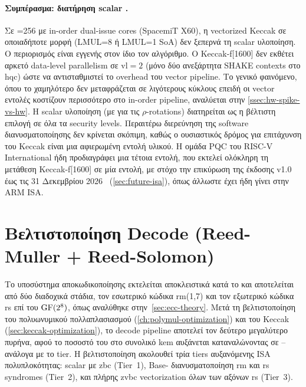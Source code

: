 \paragraph{Συμπέρασμα: διατήρηση scalar \Zbb.}
Σε \VLEN{}=\num{256} με in-order dual-issue cores (SpacemiT X60), η vectorized
Keccak σε οποιαδήποτε μορφή (LMUL=8 ή LMUL=1 SoA) δεν ξεπερνά τη scalar
υλοποίηση. Ο περιορισμός είναι εγγενής στον ίδιο τον αλγόριθμο. Ο Keccak-f[1600]
δεν εκθέτει αρκετό data-level parallelism σε $\text{vl}=2$ (μόνο δύο ανεξάρτητα
SHAKE contexts στο \gls{hqc}) ώστε να αντισταθμιστεί το overhead του vector
pipeline. Το γενικό φαινόμενο, όπου το χαμηλότερο \instret δεν μεταφράζεται σε
λιγότερους κύκλους επειδή οι vector εντολές κοστίζουν περισσότερο στο in-order
pipeline, αναλύεται στην \cref{ssec:hw-spike-vs-hw}. Η scalar \Zbb υλοποίηση
(με  για τις $\rho$-rotations) διατηρείται ως η βέλτιστη επιλογή σε
όλα τα security levels. Περαιτέρω διερεύνηση της software διανυσματοποίησης δεν
κρίνεται σκόπιμη, καθώς ο ουσιαστικός δρόμος για επιτάχυνση του Keccak είναι μια
αφιερωμένη εντολή υλικού. Η ομάδα PQC του RISC-V International ήδη προδιαγράφει
μια τέτοια εντολή, που εκτελεί ολόκληρη τη μετάθεση Keccak-f[1600] σε μία εντολή,
με στόχο την επικύρωση της έκδοσης v1.0 έως τις \num{31} Δεκεμβρίου
2026~\cite{RISCV-PQC-Keccak-Plan2026} (\cref{sec:future-isa}), όπως άλλωστε έχει
ήδη γίνει στην ARM ISA.


\section{Βελτιστοποίηση Decode (Reed-Muller + Reed-Solomon)}
\label{sec:decode-optimization}

Το υποσύστημα αποκωδικοποίησης εκτελείται αποκλειστικά κατά το \Decaps και
αποτελείται από δύο διαδοχικά στάδια, τον εσωτερικό κώδικα \gls{rm}(1,7) και
τον εξωτερικό κώδικα \gls{rs} επί του $\mathrm{GF}(2^8)$, όπως αναλύθηκε
στην~\cref{sec:ecc-theory}. Μετά τη
βελτιστοποίηση του πολυωνυμικού πολλαπλασιασμού (\cref{ch:polymul-optimization})
και του Keccak (\cref{sec:keccak-optimization}), το decode pipeline αποτελεί
τον δεύτερο μεγαλύτερο πυρήνα, αφού το ποσοστό του στο συνολικό \gls{kem} 
αυξάνεται καταναλώνοντας σε – ανάλογα με το tier.
Η βελτιστοποίηση ακολουθεί τρία tiers αυξανόμενης ISA
πολυπλοκότητας: scalar με \gls{zbc} \clmul{} (Tier~1), Base-\RVV
διανυσματοποίηση \gls{rm} και \gls{rs} syndromes (Tier~2), και πλήρης
\gls{zvbc} vectorization όλων των αξόνων \gls{rs} (Tier~3). 

